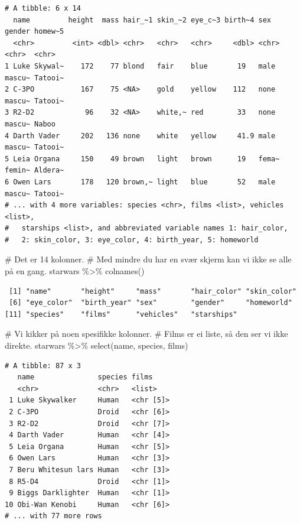\documentclass[
  letterpaper,
  DIV=11,
  numbers=noendperiod]{scrreprt}
\newenvironment{Shaded}{\begin{snugshade}}{\end{snugshade}}
\newcommand{\CommentTok}[1]{\textcolor[rgb]{0.37,0.37,0.37}{#1}}
\newcommand{\FunctionTok}[1]{\textcolor[rgb]{0.28,0.35,0.67}{#1}}
\newcommand{\NormalTok}[1]{\textcolor[rgb]{0.00,0.23,0.31}{#1}}
\newcommand{\SpecialCharTok}[1]{\textcolor[rgb]{0.37,0.37,0.37}{#1}}
\begin{document}
\begin{verbatim}
# A tibble: 6 x 14
  name         height  mass hair_~1 skin_~2 eye_c~3 birth~4 sex   gender homew~5
  <chr>         <int> <dbl> <chr>   <chr>   <chr>     <dbl> <chr> <chr>  <chr>  
1 Luke Skywal~    172    77 blond   fair    blue       19   male  mascu~ Tatooi~
2 C-3PO           167    75 <NA>    gold    yellow    112   none  mascu~ Tatooi~
3 R2-D2            96    32 <NA>    white,~ red        33   none  mascu~ Naboo  
4 Darth Vader     202   136 none    white   yellow     41.9 male  mascu~ Tatooi~
5 Leia Organa     150    49 brown   light   brown      19   fema~ femin~ Aldera~
6 Owen Lars       178   120 brown,~ light   blue       52   male  mascu~ Tatooi~
# ... with 4 more variables: species <chr>, films <list>, vehicles <list>,
#   starships <list>, and abbreviated variable names 1: hair_color,
#   2: skin_color, 3: eye_color, 4: birth_year, 5: homeworld
\end{verbatim}

\begin{Shaded}
\begin{Highlighting}[]
\CommentTok{\# Det er 14 kolonner. }
\CommentTok{\# Med mindre du har en svær skjerm kan vi ikke se alle på en gang.}
\NormalTok{starwars }\SpecialCharTok{\%\textgreater{}\%} \FunctionTok{colnames}\NormalTok{()}
\end{Highlighting}
\end{Shaded}

\begin{verbatim}
 [1] "name"       "height"     "mass"       "hair_color" "skin_color"
 [6] "eye_color"  "birth_year" "sex"        "gender"     "homeworld" 
[11] "species"    "films"      "vehicles"   "starships" 
\end{verbatim}

\begin{Shaded}
\begin{Highlighting}[]
\CommentTok{\# Vi kikker på noen spesifikke kolonner. }
\CommentTok{\# Films er ei liste, så den ser vi ikke direkte.}
\NormalTok{starwars }\SpecialCharTok{\%\textgreater{}\%} \FunctionTok{select}\NormalTok{(name, species, films)}
\end{Highlighting}
\end{Shaded}

\begin{verbatim}
# A tibble: 87 x 3
   name               species films    
   <chr>              <chr>   <list>   
 1 Luke Skywalker     Human   <chr [5]>
 2 C-3PO              Droid   <chr [6]>
 3 R2-D2              Droid   <chr [7]>
 4 Darth Vader        Human   <chr [4]>
 5 Leia Organa        Human   <chr [5]>
 6 Owen Lars          Human   <chr [3]>
 7 Beru Whitesun lars Human   <chr [3]>
 8 R5-D4              Droid   <chr [1]>
 9 Biggs Darklighter  Human   <chr [1]>
10 Obi-Wan Kenobi     Human   <chr [6]>
# ... with 77 more rows
\end{verbatim}
\end{document}
